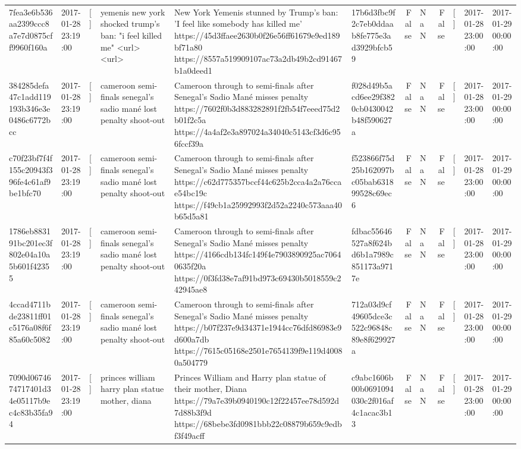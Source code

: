 \begin{tabular}{llllllrlrlll}
7fea3e6b536aa2399ccc8a7e7d0875cff9960f160a & 2017-01-28 23:19:00 & [] & yemenis new york shocked trump's ban: "i feel killed me" <url> <url> & New York Yemenis stunned by Trump's ban: 'I feel like somebody has killed me' https://45d3ffaee2630b0f26e56ff61679e9ed189bf71a80 https://8557a519909107ac73a2db49b2cd91467b1a0deed1 & 17b6d3fbc9f2c7eb0ddaab8fe775e3ad3929bfcb59 & False & NaN & False & [] & 2017-01-28 23:00:00 & 2017-01-29 00:00:00 \\
384285defa47c1add119193b346e3e0486c6772bcc & 2017-01-28 23:19:00 & [] & cameroon semi-finals senegal's sadio mané lost penalty shoot-out & Cameroon through to semi-finals after Senegal’s Sadio Mané misses penalty https://7602f0b3d883282891f2fb54f7eeed75d2b01f2c5a https://4a4af2e3a897024a34040c5143cf3d6c956fccf39a & f028d49b5acd6ee29f3820cb0430042b48f590627a & False & NaN & False & [] & 2017-01-28 23:00:00 & 2017-01-29 00:00:00 \\
c70f23bf7f4f155c20943f396fe4c61af9be1bfc70 & 2017-01-28 23:19:00 & [] & cameroon semi-finals senegal's sadio mané lost penalty shoot-out & Cameroon through to semi-finals after Senegal’s Sadio Mané misses penalty https://c62d775357bccf44c625b2cca4a2a76ccae54bc19c https://f49cb1a25992993f2d52a2240c573aaa40b65d5a81 & f523866f75d25b162097bc05bab631899528c69ec6 & False & NaN & False & [] & 2017-01-28 23:00:00 & 2017-01-29 00:00:00 \\
1786eb883191bc201ec3f802e04a10a5b601f42355 & 2017-01-28 23:19:00 & [] & cameroon semi-finals senegal's sadio mané lost penalty shoot-out & Cameroon through to semi-finals after Senegal’s Sadio Mané misses penalty https://4166cdb134fc149f4e7903890925ac70640635f20a https://0f3fd38e7af91bd973c69430b5018559c242945ae8 & fdbac55646527a8f624bd6b1a7989c851173a9717e & False & NaN & False & [] & 2017-01-28 23:00:00 & 2017-01-29 00:00:00 \\
4ccad4711bde23811ff01c5176a08f6f85a60c5082 & 2017-01-28 23:19:00 & [] & cameroon semi-finals senegal's sadio mané lost penalty shoot-out & Cameroon through to semi-finals after Senegal’s Sadio Mané misses penalty https://b07f237e9d34371e1944cc76dfd86983e9d600a7db https://7615c05168e2501e7654139f9e119d40080a504779 & 712a03d9cf49605dce3c522c96848c89e8f629927a & False & NaN & False & [] & 2017-01-28 23:00:00 & 2017-01-29 00:00:00 \\
7090d0674674717401d34e05117b9ec4c83b35fa94 & 2017-01-28 23:19:00 & [] & princes william harry plan statue mother, diana & Princes William and Harry plan statue of their mother, Diana https://79a7e39b0940190c12f22457ee78d592d7d88b3f9d https://68bebe3fd0981bbb22c08879b659c9edbf3f49acff & c9abc1606b00b0691094030c2f016af4c1acac3b13 & False & NaN & False & [] & 2017-01-28 23:00:00 & 2017-01-29 00:00:00 \\

\end{tabular}
